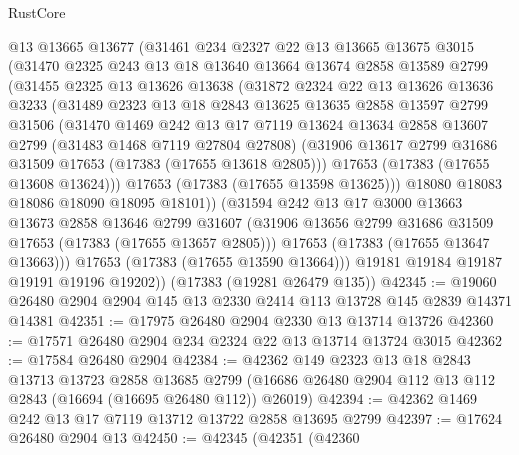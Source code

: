 \begin{lexlean}{RustCore}
\begin{coremodule}
      @13
      @13665
      @13677
      (@31461
        @234
        @2327
        @22
        @13
        @13665
        @13675
        @3015
        (@31470
          @2325
          @243
          @13
          @18
          @13640
          @13664
          @13674
          @2858
          @13589
          @2799
          (@31455
            @2325
            @13
            @13626
            @13638
            (@31872
              @2324
              @22
              @13
              @13626
              @13636
              @3233
              (@31489
                @2323
                @13
                @18
                @2843
                @13625
                @13635
                @2858
                @13597
                @2799
                @31506
                (@31470
                  @1469
                  @242
                  @13
                  @17
                  @7119
                  @13624
                  @13634
                  @2858
                  @13607
                  @2799
                  (@31483 @1468 @7119 @27804 @27808)
                  (@31906 @13617 @2799 @31686 @31509 @17653 (@17383 (@17655 @13618 @2805)))
                  @17653
                  (@17383 (@17655 @13608 @13624)))
                @17653
                (@17383 (@17655 @13598 @13625)))
              @18080
              @18083
              @18086
              @18090
              @18095
              @18101))
          (@31594
            @242
            @13
            @17
            @3000
            @13663
            @13673
            @2858
            @13646
            @2799
            @31607
            (@31906 @13656 @2799 @31686 @31509 @17653 (@17383 (@17655 @13657 @2805)))
            @17653
            (@17383 (@17655 @13647 @13663)))
          @17653
          (@17383 (@17655 @13590 @13664)))
        @19181
        @19184
        @19187
        @19191
        @19196
        @19202))
    (@17383 (@19281 @26479 @135))
@42345 := @19060 @26480 @2904 @2904 @145 @13 @2330 @2414 @113 @13728 @145 @2839 @14371 @14381
@42351 := @17975 @26480 @2904 @2330 @13 @13714 @13726
@42360 := @17571 @26480 @2904 @234 @2324 @22 @13 @13714 @13724 @3015
@42362 := @17584 @26480 @2904
@42384 := @42362
    @149
    @2323
    @13
    @18
    @2843
    @13713
    @13723
    @2858
    @13685
    @2799
    (@16686 @26480 @2904 @112 @13 @112 @2843 (@16694 (@16695 @26480 @112)) @26019)
@42394 := @42362 @1469 @242 @13 @17 @7119 @13712 @13722 @2858 @13695 @2799
@42397 := @17624 @26480 @2904 @13
@42450 := @42345
    (@42351
      (@42360

\end{coremodule}
\end{lexlean}
